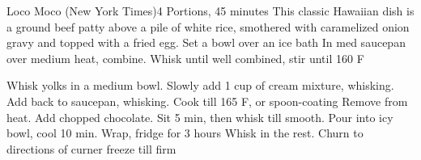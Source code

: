 \documentclass[a6paper,landscape]{article}
\begin{document}
\begin{recipe}{Loco Moco (New York Times)}{4 Portions, 45 minutes}{}
  \freeform This classic Hawaiian dish is a ground beef patty above a pile of white rice, smothered with caramelized onion gravy and topped with a fried egg.
  Set a bowl over an ice bath
  \newstep
  In med saucepan over medium heat, combine. Whisk until well combined, stir until 160 F

  Whisk yolks in a medium bowl. Slowly add 1 cup of cream mixture, whisking. Add back to saucepan, whisking. Cook till 165 F, or spoon-coating
  Remove from heat. Add chopped chocolate. Sit 5 min, then whisk till smooth.
  \newstep
  Pour into icy bowl, cool 10 min. Wrap, fridge for 3 hours
  Whisk in the rest. 
  \newstep
  Churn to directions of curner
  \newstep
  freeze till firm
  \end{recipe}
\end{document}
